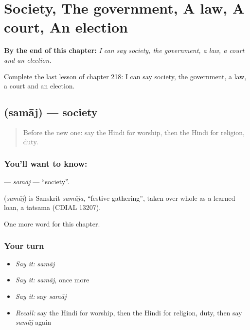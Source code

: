
\chapter{Society, The government, A law, A court, An election}
\label{ch:hi-society-the-government-a-law-a-court-an-election}

\begin{chapteropening}
\textbf{By the end of this chapter:} \emph{I can say society, the government, a law, a court and an election.}

Complete the last lesson of chapter 218: I can say society, the government, a law, a court and an election.
\end{chapteropening}

\section[\texorpdfstring{\hi{समाज} (samāj)}{समाज (samāj)}]{ (samāj) — society}

\label{lesson:HI-C218-samaj}



\begin{quote}
Before the new one: say the Hindi for worship, then the Hindi for religion, duty.
\end{quote}

\subsection*{You'll want to know: }
\textbf{} — \emph{samāj} — \textquotedblleft{}society\textquotedblright{}.

\begin{cousinweb}
\textbf{} (\emph{samāj}) is Sanskrit \emph{samāja}, \textquotedblleft{}festive gathering\textquotedblright{}, taken over whole as a learned loan, a tatsama (CDIAL 13207).
\end{cousinweb}

\begin{grammarlens}[title={What you've built}]
One more word for this chapter.
\end{grammarlens}

\subsection*{Your turn}
\begin{itemize}
\raggedright
  \item \emph{Say it:} \emph{samāj}
  \item \emph{Say it:} \emph{samāj}, once more
  \item \emph{Say it:} say \emph{samāj}
  \item \emph{Recall:} say the Hindi for worship, then the Hindi for religion, duty, then say \emph{samāj} again
\end{itemize}

